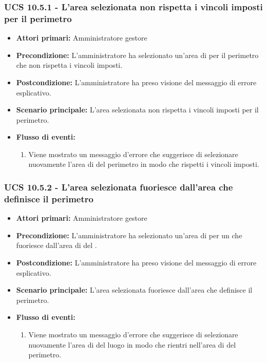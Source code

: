 \subsubsection{UCS 10.5.1 - L'area selezionata non rispetta i vincoli imposti per il perimetro}%
\begin{itemize}
\item \textbf{Attori primari:} Amministratore gestore
\item \textbf{Precondizione:} L'amministratore ha selezionato un'area di  per il perimetro che non rispetta i vincoli imposti.
\item \textbf{Postcondizione:} L'amministratore ha preso visione del messaggio di errore esplicativo.
\item \textbf{Scenario principale:} L'area selezionata non rispetta i vincoli imposti per il perimetro.
\item \textbf{Flusso di eventi:}
    \begin{enumerate}
    \item Viene mostrato un messaggio d'errore che suggerisce di selezionare nuovamente l'area di  del perimetro in modo che rispetti i vincoli imposti.
    \end{enumerate} 
\end{itemize}

\subsubsection{UCS 10.5.2 - L'area selezionata fuoriesce dall'area che definisce il perimetro}%
\begin{itemize}
\item \textbf{Attori primari:} Amministratore gestore
\item \textbf{Precondizione:} L'amministratore ha selezionato un'area di  per un  che fuoriesce dall'area di  del .
\item \textbf{Postcondizione:} L'amministratore ha preso visione del messaggio di errore esplicativo.
\item \textbf{Scenario principale:} L'area selezionata fuoriesce dall'area che definisce il perimetro.
\item \textbf{Flusso di eventi:}
    \begin{enumerate}
    \item Viene mostrato un messaggio d'errore che suggerisce di selezionare nuovamente l'area di  del luogo in modo che rientri nell'area di  del perimetro.
    \end{enumerate} 
\end{itemize}


